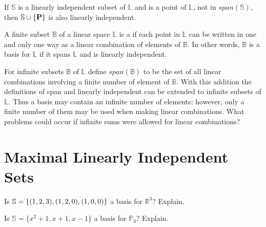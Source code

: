\begin{theorem}
	If $\mathbb{S}$ is a linearly independent subset of $\mathbb{L}$ and  is a point of $\mathbb{L}$, not in $span(\mathbb{S})$, then $\mathbb{S} \cup \{ \textbf{P} \}$ is also linearly independent. 
\end{theorem}
\vspace{-.3in}\hspace{5in}\begin{annotation}
\end{annotation}


\begin{defn}
	A finite subset $\mathbb{B}$ of a linear space $\mathbb{L}$ is a  if each point in $\mathbb{L}$ can be written in one and only one way as a linear combination of elements of $\mathbb{B}$. In other words, $\mathbb{B}$ is a basis for $\mathbb{L}$ if it spans $\mathbb{L}$ and is linearly independent.
\end{defn}

\noindent {} For infinite subsets $\mathbb{B}$ of $\mathbb{L}$  define $span(\mathbb{B})$ to be the set of all linear combinations involving a finite number of element of $\mathbb{B}$. With this addition the definitions of span and linearly independent can be extended to infinite subsets of $\mathbb{L}$. Thus a basis may contain an infinite number of elements; however, only a finite number of them may be used when making linear combinations. What problems could occur if infinite sums were allowed for linear combinations? 

\section{Maximal Linearly Independent Sets}    \label{Maximal Linearly Independent Sets}

\begin{myexa}[\bd{a}]
	Is $\mathbb{S} = \{ ({1},{2},{3}),({1},{2},{0}),({1},{0},{0}) \} $ a basis for $\mathbb{R}^3$?  Explain.
\end{myexa}

\begin{myexb}[\bd{b}]
	Is $\mathbb{S} = \{x^2+1, x+1, x-1 \} $ a basis for $\mathbb{P}_3$? Explain.
\end{myexb}

